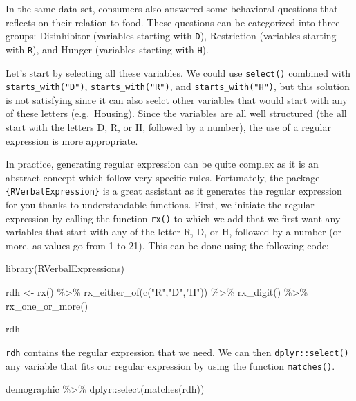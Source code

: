 \documentclass[
]{book}
\newenvironment{Shaded}{\begin{snugshade}}{\end{snugshade}}
\newcommand{\FunctionTok}[1]{\textcolor[rgb]{0.00,0.00,0.00}{#1}}
\newcommand{\NormalTok}[1]{#1}
\newcommand{\OtherTok}[1]{\textcolor[rgb]{0.56,0.35,0.01}{#1}}
\newcommand{\SpecialCharTok}[1]{\textcolor[rgb]{0.00,0.00,0.00}{#1}}
\newcommand{\StringTok}[1]{\textcolor[rgb]{0.31,0.60,0.02}{#1}}
\begin{document}
In the same data set, consumers also answered some behavioral questions that reflects on their relation to food. These questions can be categorized into three groups: Disinhibitor (variables starting with \texttt{D}), Restriction (variables starting with \texttt{R}), and Hunger (variables starting with \texttt{H}).

Let's start by selecting all these variables. We could use \texttt{select()} combined with \texttt{starts\_with("D")}, \texttt{starts\_with("R")}, and \texttt{starts\_with("H")}, but this solution is not satisfying since it can also seelct other variables that would start with any of these letters (e.g.~Housing). Since the variables are all well structured (the all start with the letters D, R, or H, followed by a number), the use of a regular expression is more appropriate.

In practice, generating regular expression can be quite complex as it is an abstract concept which follow very specific rules. Fortunately, the package \texttt{\{RVerbalExpression\}} is a great assistant as it generates the regular expression for you thanks to understandable functions. First, we initiate the regular expression by calling the function \texttt{rx()} to which we add that we first want any variables that start with any of the letter R, D, or H, followed by a number (or more, as values go from 1 to 21). This can be done using the following code:

\begin{Shaded}
\begin{Highlighting}[]
\FunctionTok{library}\NormalTok{(RVerbalExpressions)}

\NormalTok{rdh }\OtherTok{\textless{}{-}} \FunctionTok{rx}\NormalTok{() }\SpecialCharTok{\%\textgreater{}\%} 
  \FunctionTok{rx\_either\_of}\NormalTok{(}\FunctionTok{c}\NormalTok{(}\StringTok{"R"}\NormalTok{,}\StringTok{"D"}\NormalTok{,}\StringTok{"H"}\NormalTok{)) }\SpecialCharTok{\%\textgreater{}\%} 
  \FunctionTok{rx\_digit}\NormalTok{() }\SpecialCharTok{\%\textgreater{}\%} 
  \FunctionTok{rx\_one\_or\_more}\NormalTok{()}

\NormalTok{rdh}
\end{Highlighting}
\end{Shaded}

\texttt{rdh} contains the regular expression that we need. We can then \texttt{dplyr::select()} any variable that fits our regular expression by using the function \texttt{matches()}.

\begin{Shaded}
\begin{Highlighting}[]
\NormalTok{demographic }\SpecialCharTok{\%\textgreater{}\%} 
\NormalTok{  dplyr}\SpecialCharTok{::}\FunctionTok{select}\NormalTok{(}\FunctionTok{matches}\NormalTok{(rdh))}
\end{Highlighting}
\end{Shaded}
\end{document}
